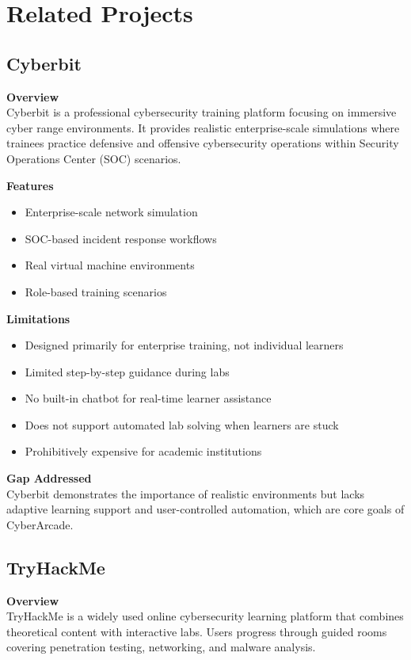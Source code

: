 \documentclass[12pt,a4paper]{report}
\begin{document}
\section{Related Projects}

\subsection{Cyberbit}

\textbf{Overview}\\
Cyberbit is a professional cybersecurity training platform focusing on immersive cyber range
environments. It provides realistic enterprise-scale simulations where trainees practice defensive and
offensive cybersecurity operations within Security Operations Center (SOC) scenarios.

\textbf{Features}
\begin{itemize}
  \item Enterprise-scale network simulation
  \item SOC-based incident response workflows
  \item Real virtual machine environments
  \item Role-based training scenarios
\end{itemize}

\textbf{Limitations}
\begin{itemize}
  \item Designed primarily for enterprise training, not individual learners
  \item Limited step-by-step guidance during labs
  \item No built-in chatbot for real-time learner assistance
  \item Does not support automated lab solving when learners are stuck
  \item Prohibitively expensive for academic institutions
\end{itemize}

\textbf{Gap Addressed}\\
Cyberbit demonstrates the importance of realistic environments but lacks adaptive learning support and
user-controlled automation, which are core goals of CyberArcade.

\subsection{TryHackMe}

\textbf{Overview}\\
TryHackMe is a widely used online cybersecurity learning platform that combines theoretical content
with interactive labs. Users progress through guided rooms covering penetration testing, networking,
and malware analysis.
\end{document}
